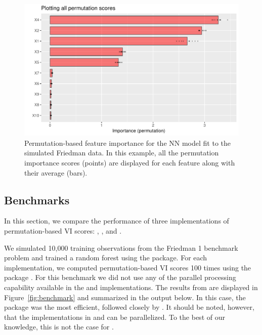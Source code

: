 \begin{figure}[!htb]
  \centering
  \includegraphics[width=1\linewidth]{figures/vip-permute-nn-all}
  \caption{Permutation-based feature importance for the NN model fit to the simulated Friedman data. In this example, all the permutation importance scores (points) are displayed for each feature along with their average (bars).}
  \label{fig:vip-permute-nn-all}
\end{figure}


\subsection{Benchmarks}

In this section, we compare the performance of three implementations of permutation-based VI scores: , , and .

We simulated 10,000 training observations from the Friedman 1 benchmark problem and trained a random forest using the  package. For each implementation, we computed permutation-based VI scores 100 times using the  package \citep{microbenchmark-pkg}. For this benchmark we did not use any of the parallel processing capability available in the  and  implementations. The results from  are displayed in Figure~\ref{fig:benchmark} and summarized in the output below. In this case, the  package was the most efficient, followed closely by . It should be noted, however, that the implementations in  and  can be parallelized. To the best of our knowledge, this is not the case for .

